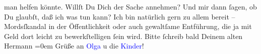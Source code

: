                man helfen könnte. Willſt Du Dich der Sache annehmen? Und mir dann ſagen, ob Du
               glaubſt, daß ich was tun kann? Ich bin natürlich gern zu allem bereit – Mordsſkandal
               in der Öffentlichkeit oder auch gewaltſame Entführung, die ja mit Geld dort leicht zu
               bewerkſtelligen ſein wird. Bitte ſchreib bald\pend
           \pstart
           Deinem alten{\\[\baselineskip]}\spacefill\mbox{Hermann}\pend
           \leftskip=0em{}\pstart
           \noindent{}Grüße an \textcolor{blue}{Olga}{}\ledrightnote{\textcolor{blue}{Olga Schnitzler}} u die \textcolor{blue}{Kinder}{}!\pend
           \endnumbering{}  
      